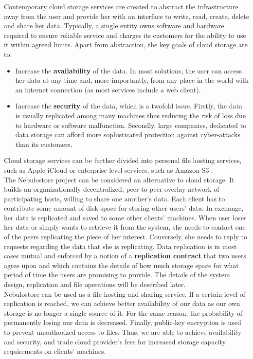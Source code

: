 \documentclass{pracamgren}
\begin{document}
Contemporary cloud storage services are created to abstract the infrastructure away from the user and provide her with an interface to write, read, create, delete and share her data. Typically, a single entity owns software and hardware required to ensure reliable service and charges its customers for the ability to use it within agreed limits. Apart from abstraction, the key goals of cloud storage are to:
\begin{itemize}
\item Increase the {\bf availability} of the data. In most solutions, the user can access her data at any time and, more importantly, from any place in the world with an internet connection (as most services include a web client).
\item Increase the {\bf security} of the data, which is a twofold issue. Firstly, the data is usually replicated among many machines thus reducing the risk of loss due to hardware or software malfunction. Secondly, large companies, dedicated to data storage can afford more sophisticated protection against cyber-attacks than its customers.
\end{itemize}
Cloud storage services can be further divided into personal file hosting services, such as Apple iCloud \cite{icloud} or enterprise-level services, such as Amazon S3 \cite{amazon}.\\

The Nebulostore project can be considered an alternative to cloud storage. It builds an organizationally-decentralized, peer-to-peer overlay network of participating hosts, willing to share one another's data. Each client has to contribute some amount of disk space for storing other users' data. In exchange, her data is replicated and saved to some other clients' machines. When user loses her data or simply wants to retrieve it from the system, she needs to contact one of the peers replicating the piece of her interest. Conversely, she needs to reply to requests regarding the data that she is replicating. Data replication is in most cases mutual and enforced by a notion of a {\bf replication contract} that two users agree upon and which contains the details of how much storage space for what period of time the users are promising to provide. The details of the system design, replication and file operations will be described later.\\

Nebulostore can be used as a file hosting and sharing service. If a certain level of replication is reached, we can achieve better availability of our data as our own storage is no longer a single source of it. For the same reason, the probability of permanently losing our data is decreased. Finally, public-key encryption is used to prevent unauthorized access to files. Thus, we are able to achieve availability and security, and trade cloud provider's fees for increased storage capacity requirements on clients' machines.\\
\end{document}
